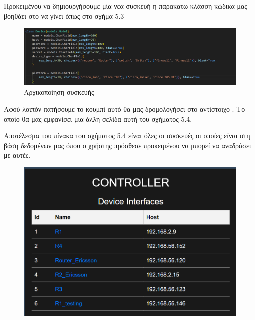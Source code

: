 \FloatBarrier %

\section{}

Προκειμένου να δημιουργήσουμε μία νεα συσκευή η παρακατω κλάσση
κώδικα μας βοηθάει στο να γίνει όπως στο σχήμα 5.3

\begin{figure}[htb]
	\centering
	\includegraphics[width=1.2\textwidth]{graphics/class_device.png}
	\caption{Αρχικοποίηση συσκευής}
\end{figure}

\FloatBarrier

Αφού λοιπόν πατήσουμε το κουμπί  αυτό θα μας δρομολογήσει στο αντίστοιχο .
Το οποίο θα μας εμφανίσει μια άλλη σελίδα αυτή του σχήματος 5.4. 

Αποτέλεσμα του πίνακα του σχήματος 5.4 είναι όλες οι συσκευές οι οποίες
είναι στη βάση δεδομένων μας όπου ο χρήστης πρόσθεσε προκειμένου
να μπορεί να αναδράσει με αυτές.

\begin{figure}[htb]
	\centering
	\includegraphics[width=1.2\textwidth]{graphics/device_interfaces.png}
	\caption{}
\end{figure}

